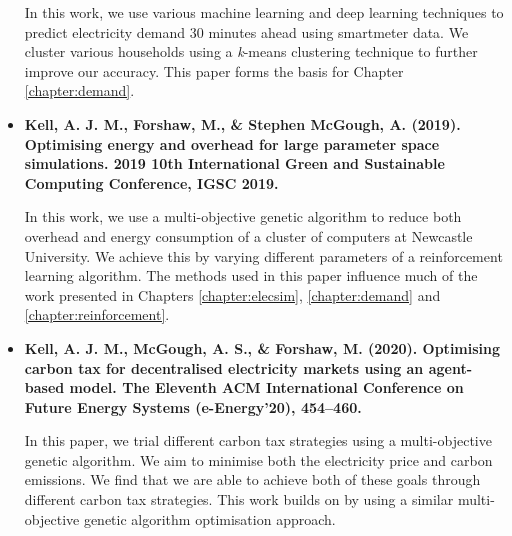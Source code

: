 \begin{itemize}
	In this work, we use various machine learning and deep learning techniques to predict electricity demand 30 minutes ahead using \gls{smartmeter} data. We cluster various households using a \textit{k}-means clustering technique to further improve our accuracy. This paper forms the basis for Chapter \ref{chapter:demand}.
	
	\item[\textbf{\cite{Kell2019}}] \textbf{Kell, A. J. M., Forshaw, M., \& Stephen McGough, A. (2019). Optimising energy and overhead for large parameter space simulations. 2019 10th International Green and Sustainable Computing Conference, IGSC 2019. }
	
	In this work, we use a multi-objective genetic algorithm to reduce both overhead and energy consumption of a cluster of computers at Newcastle University. We achieve this by varying different parameters of a reinforcement learning algorithm. The methods used in this paper influence much of the work presented in Chapters \ref{chapter:elecsim}, \ref{chapter:demand} and \ref{chapter:reinforcement}.
	
	\item[\textbf{\cite{Kell2020a}}] \textbf{Kell, A. J. M., McGough, A. S., \& Forshaw, M. (2020). Optimising carbon tax for decentralised electricity markets using an agent-based model. The Eleventh ACM International Conference on Future Energy Systems (e-Energy’20), 454–460.}
	
	In this paper, we trial different carbon tax strategies using a multi-objective genetic algorithm. We aim to minimise both the electricity price and carbon emissions. We find that we are able to achieve both of these goals through different carbon tax strategies. This work builds on \cite{Kell2019} by using a similar multi-objective genetic algorithm optimisation approach. 
	
\end{itemize}



